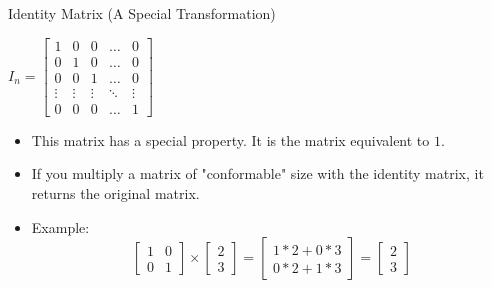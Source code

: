 \documentclass[aspectratio=43]{beamer}
\begin{document}
\begin{frame}{Identity Matrix (A Special Transformation)}
  \begin{center}
    $I_n = \begin{bmatrix}
        1      & 0      & 0      & \dots  & 0      \\
        0      & 1      & 0      & \dots  & 0      \\
        0      & 0      & 1      & \dots  & 0      \\
        \vdots & \vdots & \vdots & \ddots & \vdots \\
        0      & 0      & 0      & \dots  & 1
      \end{bmatrix} $
  \end{center}

  \begin{itemize}
    \item This matrix has a special property. It is the matrix equivalent to $1$.

    \item If you multiply a matrix of "conformable" size with the identity matrix, it returns the original matrix.

    \item Example: $$
            \begin{bmatrix} 1 & 0 \\ 0 & 1 \end{bmatrix} \times
            \begin{bmatrix} 2 \\ 3 \end{bmatrix} =
            \begin{bmatrix} 1*2 + 0*3 \\ 0*2 + 1*3 \end{bmatrix} =
            \begin{bmatrix} 2 \\ 3 \end{bmatrix}
          $$
  \end{itemize}
\end{frame}
\end{document}
